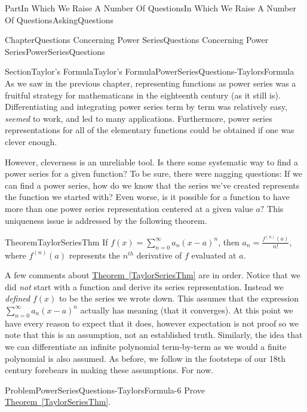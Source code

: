 \documentclass[oneside,10pt,]{book}
\newcommand{\xreffont}{\relax}
\numberwithin{equation}{part}
\begin{document}
\begin{partptx}{Part}{In Which We Raise A Number Of Questions}{}{In Which We Raise A Number Of Questions}{}{}{AskingQuestions}
\begin{chapterptx}{Chapter}{Questions Concerning Power Series}{}{Questions Concerning Power Series}{}{}{PowerSeriesQuestions}
\renewcommand*{\chaptername}{Chapter}
%
%
\typeout{************************************************}
\typeout{************************************************}
%
\begin{sectionptx}{Section}{Taylor's Formula}{}{Taylor's Formula}{}{}{PowerSeriesQuestions-TaylorsFormula}
As we saw in the previous chapter, representing functions as power series was a fruitful strategy for mathematicans in the eighteenth century (as it still is).  Differentiating and integrating power series term by term was relatively easy, \emph{seemed} to work, and led to many applications.  Furthermore, power series representations for all of the elementary functions could be obtained if one was clever enough.%
\par
However, cleverness is an unreliable tool. Is there some systematic way to find a power series for a given function? To be sure, there were nagging questions: If we can find a power series, how do we know that the series we've created represents the function we started with? Even worse, is it possible for a function to have more than one power series representation centered at a given value \(a?\) This uniqueness issue is addressed by the following theorem.%
\begin{theorem}{Theorem}{}{}{TaylorSeriesThm}%
 If \(f(x)=\sum_{n=0}^\infty a_n(x-a)^n\), then \(a_n=\frac{f^{(n)}(a)}{n!}\), where \(f^{(n)}(a)\) represents the \(n^{th}\) derivative of \(f\) evaluated at \(a\).%
\end{theorem}
A few comments about \hyperref[TaylorSeriesThm]{Theorem~{\xreffont\ref{TaylorSeriesThm}}} are in order. Notice that we did \emph{not} start with a function and derive its series representation. Instead we \emph{defined} \(f(x)\) to be the series we wrote down. This assumes that the expression \(\sum_{n=0}^\infty a_n(x-a)^n\) actually has meaning (that it converges). At this point we have every reason to expect that it does, however expectation is not proof so we note that this is an assumption, not an established truth. Similarly, the idea that we can differentiate an infinite polynomial term-by-term as we would a finite polynomial is also assumed. As before, we follow in the footsteps of our 18th century forebears in making these assumptions. For now.%
\begin{problem}{Problem}{}{PowerSeriesQuestions-TaylorsFormula-6}%
 Prove \hyperref[TaylorSeriesThm]{Theorem~{\xreffont\ref{TaylorSeriesThm}}}.%
\par\smallskip%

\end{problem}
\end{sectionptx}
\end{chapterptx}
\end{partptx}
\end{document}
